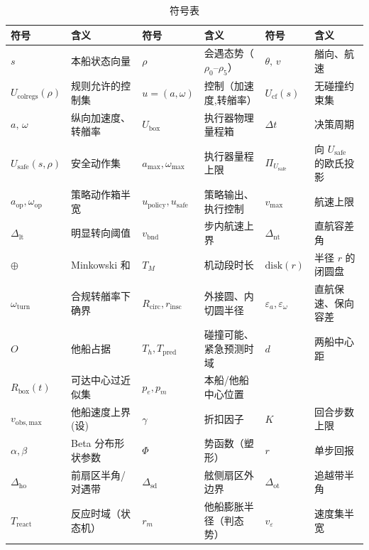 \documentclass[12pt,letterpaper]{article}
\begin{document}
\begin{table}[htbp]
 \caption{符号表}
 \label{tab:notation}
 \centering\footnotesize
 \setlength{\tabcolsep}{6pt}
 \setlength{\tabcolsep}{3.2pt}\begin{tabular*}{\linewidth}{@{\extracolsep{\fill}}llllll@{}}
  \toprule
  符号 & 含义 & 符号 & 含义 & 符号 & 含义 \\
  \midrule
  $s$ & 本船状态向量 & $\rho$ & 会遇态势（$\rho_0$--$\rho_5$） & $\theta,\,v$ & 艏向、航速 \\
  $U_{\mathrm{colregs}}(\rho)$ & 规则允许的控制集 & $u=(a,\omega)$ & 控制（加速度,转艏率） & $U_{\mathrm{cf}}(s)$ & 无碰撞约束集 \\
  $a,\,\omega$ & 纵向加速度、转艏率 & $U_{\mathrm{box}}$ & 执行器物理量程箱 & $\Delta t$ & 决策周期 \\
  $U_{\mathrm{safe}}(s,\rho)$ & 安全动作集 & $a_{\max},\omega_{\max}$ & 执行器量程上限 & $\Pi_{U_{\mathrm{safe}}}$ & 向 $U_{\mathrm{safe}}$ 的欧氏投影 \\
  $a_{\mathrm{op}},\omega_{\mathrm{op}}$ & 策略动作箱半宽 & $u_{\mathrm{policy}},u_{\mathrm{safe}}$ & 策略输出、执行控制 & $v_{\max}$ & 航速上限 \\
  $\Delta_{\mathrm{lt}}$ & 明显转向阈值 & $v_{\mathrm{bnd}}$ & 步内航速上界 & $\Delta_{\mathrm{nt}}$ & 直航容差角 \\
  $\oplus$ & Minkowski 和 & $T_M$ & 机动段时长 & $\mathrm{disk}(r)$ & 半径 $r$ 的闭圆盘 \\
  $\omega_{\mathrm{turn}}$ & 合规转艏率下确界 & $R_{\mathrm{circ}},r_{\mathrm{insc}}$ & 外接圆、内切圆半径 & $\varepsilon_a,\varepsilon_\omega$ & 直航保速、保向容差 \\
  $O$ & 他船占据 & $T_h,T_{\mathrm{pred}}$ & 碰撞可能、紧急预测时域 & $d$ & 两船中心距 \\
  $R_{\mathrm{box}}(t)$ & 可达中心过近似集 & $p_e,p_m$ & 本船/他船中心位置\\
  $v_{\mathrm{obs,max}}$ & 他船速度上界(设) & $\gamma$ & 折扣因子 & $K$ & 回合步数上限 \\
  $\alpha,\beta$ & Beta 分布形状参数 & $\Phi$ & 势函数（塑形） & $r$ & 单步回报 \\
  $\Delta_{\mathrm{ho}}$ & 前扇区半角/对遇带 & $\Delta_{\mathrm{sd}}$ & 舷侧扇区外边界 & $\Delta_{\mathrm{ot}}$ & 追越带半角 \\
  $T_{\mathrm{react}}$ & 反应时域（状态机） & $r_m$ & 他船膨胀半径（判态势） & $v_\varepsilon$ & 速度集半宽 \\

\end{tabular*}
\end{table}
\end{document}
